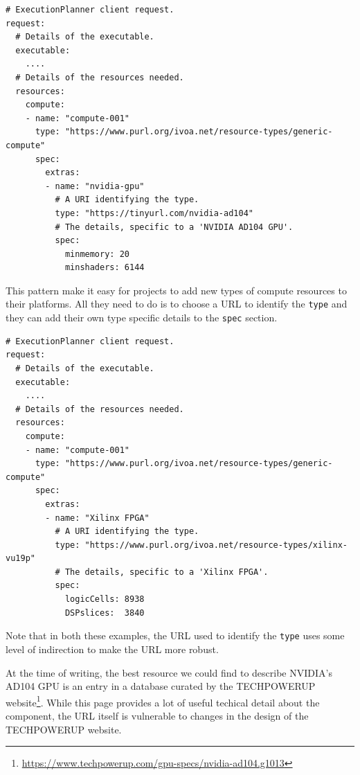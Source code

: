 \documentclass[11pt,a4paper]{ivoa}
\newcommand{\codeword}[1] {\texttt{#1}}
\newcommand{\footurl}[1] {\footnote{\url{#1}}}
\begin{document}
\begin{lstlisting}[]
# ExecutionPlanner client request.
request:
  # Details of the executable.
  executable:
    ....
  # Details of the resources needed.
  resources:
    compute:
    - name: "compute-001"
      type: "https://www.purl.org/ivoa.net/resource-types/generic-compute"
      spec:
        extras:
        - name: "nvidia-gpu"
          # A URI identifying the type.
          type: "https://tinyurl.com/nvidia-ad104"
          # The details, specific to a 'NVIDIA AD104 GPU'.
          spec:
            minmemory: 20
            minshaders: 6144
\end{lstlisting}

This pattern make it easy for projects to add new types of compute resources to their
platforms. All they need to do is to choose a URL to identify the \codeword{type}
and they can add their own type specific details to the \codeword{spec} section.

\begin{lstlisting}[]
# ExecutionPlanner client request.
request:
  # Details of the executable.
  executable:
    ....
  # Details of the resources needed.
  resources:
    compute:
    - name: "compute-001"
      type: "https://www.purl.org/ivoa.net/resource-types/generic-compute"
      spec:
        extras:
        - name: "Xilinx FPGA"
          # A URI identifying the type.
          type: "https://www.purl.org/ivoa.net/resource-types/xilinx-vu19p"
          # The details, specific to a 'Xilinx FPGA'.
          spec:
            logicCells: 8938
            DSPslices:  3840
\end{lstlisting}

Note that in both these examples, the URL used to identify the \codeword{type}
uses some level of indirection to make the URL more robust.

At the time of writing, the best resource we could find to describe NVIDIA's AD104 GPU
is an entry in a database curated by the TECHPOWERUP
website\footurl{https://www.techpowerup.com/gpu-specs/nvidia-ad104.g1013}.
While this page provides a lot of useful techical detail about the component,
the URL itself is vulnerable to changes in the design of the TECHPOWERUP website.
\end{document}
